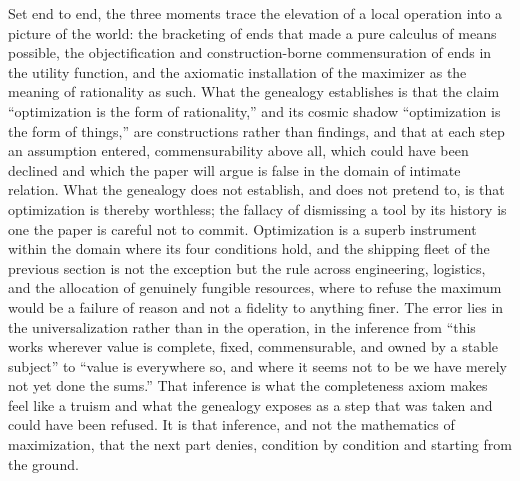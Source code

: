 Set end to end, the three moments trace the elevation of a local operation into a picture of the world: the bracketing of ends that made a pure calculus of means possible, the objectification and construction-borne commensuration of ends in the utility function, and the axiomatic installation of the maximizer as the meaning of rationality as such. What the genealogy establishes is that the claim ``optimization is the form of rationality,'' and its cosmic shadow ``optimization is the form of things,'' are constructions rather than findings, and that at each step an assumption entered, commensurability above all, which could have been declined and which the paper will argue is false in the domain of intimate relation. What the genealogy does not establish, and does not pretend to, is that optimization is thereby worthless; the fallacy of dismissing a tool by its history is one the paper is careful not to commit. Optimization is a superb instrument within the domain where its four conditions hold, and the shipping fleet of the previous section is not the exception but the rule across engineering, logistics, and the allocation of genuinely fungible resources, where to refuse the maximum would be a failure of reason and not a fidelity to anything finer. The error lies in the universalization rather than in the operation, in the inference from ``this works wherever value is complete, fixed, commensurable, and owned by a stable subject'' to ``value is everywhere so, and where it seems not to be we have merely not yet done the sums.'' That inference is what the completeness axiom makes feel like a truism and what the genealogy exposes as a step that was taken and could have been refused. It is that inference, and not the mathematics of maximization, that the next part denies, condition by condition and starting from the ground.
